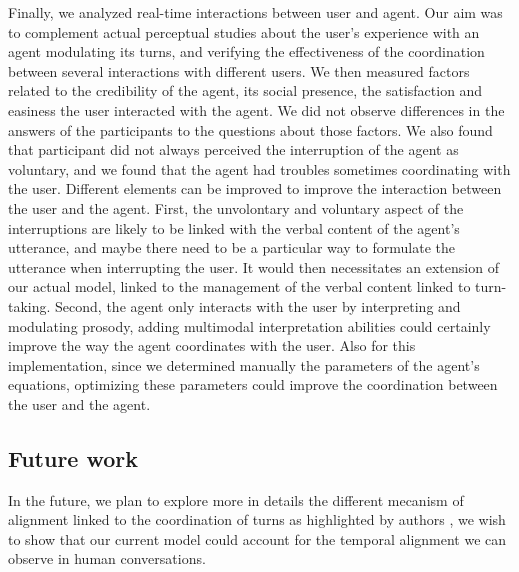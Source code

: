 Finally, we analyzed real-time interactions between user and agent. Our aim was to complement actual perceptual studies about the user's experience with an agent modulating its turns, and verifying the effectiveness of the coordination between several interactions with different users. We then measured factors related to the credibility of the agent, its social presence, the satisfaction and easiness the user interacted with the agent.  We did not observe differences in the answers of the participants to the questions about those factors. We also found that participant did not always perceived the interruption of the agent as voluntary, and we found that the agent had troubles sometimes coordinating with the user. Different elements can be improved to improve the interaction between the user and the agent. First, the unvolontary and voluntary aspect of the interruptions are likely to be linked with the verbal content of the agent's utterance, and maybe there need to be a particular way to formulate the utterance when interrupting the user. It would then necessitates an extension of our actual model, linked to the management of the verbal content linked to turn-taking. Second, the agent only interacts with the user by interpreting and modulating prosody, adding multimodal interpretation abilities could certainly improve the way the agent coordinates with the user. Also for this implementation, since we determined manually the parameters of the agent's equations, optimizing these parameters could improve the coordination between the user and the agent. 

\subsection{Future work}

In the future, we plan to explore more in details the different mecanism of alignment linked to the coordination of turns as highlighted by authors \citep{benus_pragmatic_2011}, we wish to show that our current model could account for the temporal alignment we can observe in human conversations.  

